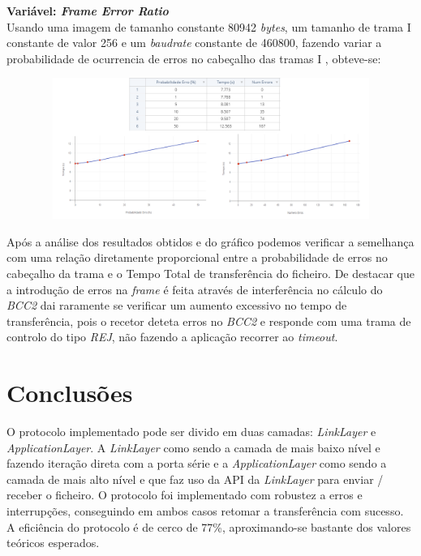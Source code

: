 \documentclass[a4paper, 11pt]{article}
\begin{document}
\textbf{Variável: \textit{Frame Error Ratio}}\\
Usando uma imagem de tamanho constante 80942 \textit{bytes}, um tamanho de trama I constante de valor 256 e um \textit{baudrate} constante de 460800, fazendo variar a probabilidade de ocurrencia de erros no cabeçalho das tramas I , obteve-se:
\begin{figure}[h!]
\begin{center}
\includegraphics[width=13cm, height= 4.6cm]{images/FER.png}
\end{center}
\end{figure}

Após a análise dos resultados obtidos e do gráfico podemos verificar a semelhança com uma relação diretamente proporcional entre a probabilidade de erros no cabeçalho da trama e o Tempo Total de transferência do ficheiro. De destacar que a introdução de erros na \textit{frame} é feita através de interferência no cálculo do \textit{BCC2} dai raramente se verificar um aumento excessivo no tempo de transferência, pois o recetor deteta erros no \textit{BCC2} e responde com uma trama de controlo do tipo \textit{REJ}, não fazendo a aplicação recorrer ao \textit{timeout}.


\section{Conclusões}

O protocolo implementado pode ser divido em duas camadas: \textit{LinkLayer} e \textit{ApplicationLayer}. A \textit{LinkLayer} como sendo a camada de mais baixo nível e fazendo iteração direta com a porta série e a \textit{ApplicationLayer} como sendo a camada de mais alto nível e que faz uso da API da \textit{LinkLayer} para enviar / receber o ficheiro. O protocolo foi implementado com robustez a erros e interrupções, conseguindo em ambos casos retomar a transferência com sucesso. A eficiência do protocolo é de cerco de 77\%, aproximando-se bastante dos valores teóricos esperados.
\end{document}
